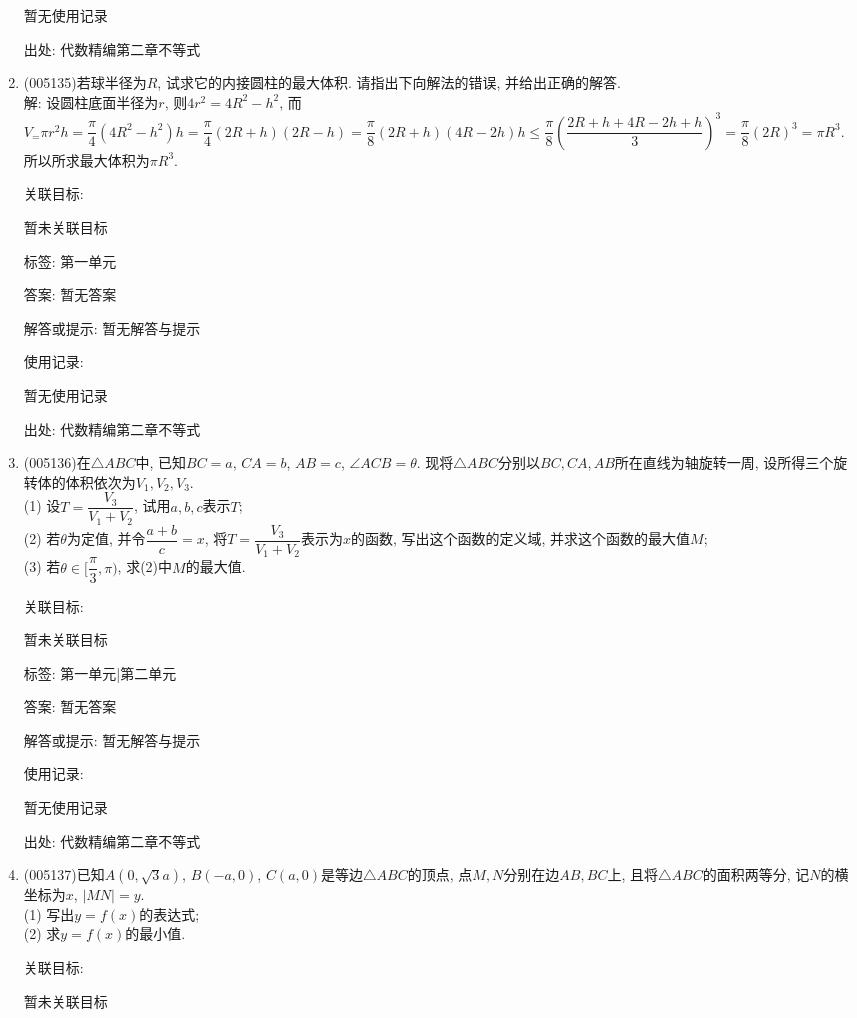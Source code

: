 \documentclass[10pt,a4paper]{article}
\begin{document}
\begin{enumerate}[1.]
暂无使用记录


出处: 代数精编第二章不等式
\item { (005135)}若球半径为$R$, 试求它的内接圆柱的最大体积. 请指出下向解法的错误, 并给出正确的解答.\\
解: 设圆柱底面半径为$r$, 则$4r^2=4R^2-h^2$, 而$V_=\pi {r^2}h=\dfrac{\pi}4(4{R^2}-{h^2})h=\dfrac{\pi }4(2R+h)(2R-h)=\dfrac{\pi}8(2R+h)(4R-2h)h\le \dfrac{\pi}8(\dfrac{2R+h+4R-2h+h}3)^3=\dfrac{\pi}8(2R)^3=\pi R^3$. 所以所求最大体积为$\pi R^3$.


关联目标:

暂未关联目标



标签: 第一单元

答案: 暂无答案

解答或提示: 暂无解答与提示

使用记录:

暂无使用记录


出处: 代数精编第二章不等式
\item { (005136)}在$\triangle ABC$中, 已知$BC=a$, $CA=b$, $AB=c$, $\angle ACB=\theta$. 现将$\triangle ABC$分别以$BC,CA,AB$所在直线为轴旋转一周, 设所得三个旋转体的体积依次为$V_1,V_2,V_3$.\\
(1) 设$T=\dfrac{V_3}{V_1+V_2}$, 试用$a,b,c$表示$T$;\\
(2) 若$\theta$为定值, 并令$\dfrac{a+b}c=x$, 将$T=\dfrac{V_3}{V_1+V_2}$表示为$x$的函数, 写出这个函数的定义域, 并求这个函数的最大值$M$;\\
(3) 若$\theta \in [\dfrac{\pi }3,\pi)$, 求(2)中$M$的最大值.


关联目标:

暂未关联目标



标签: 第一单元|第二单元

答案: 暂无答案

解答或提示: 暂无解答与提示

使用记录:

暂无使用记录


出处: 代数精编第二章不等式
\item { (005137)}已知$A(0,\sqrt 3a)$, $B(-a,0)$, $C(a,0)$是等边$\triangle ABC$的顶点, 点$M,N$分别在边$AB,BC$上, 且将$\triangle ABC$的面积两等分, 记$N$的横坐标为$x$, $|MN|=y$.\\
(1) 写出$y=f(x)$的表达式;\\
(2) 求$y=f(x)$的最小值.


关联目标:

暂未关联目标




\end{enumerate}
\end{document}

